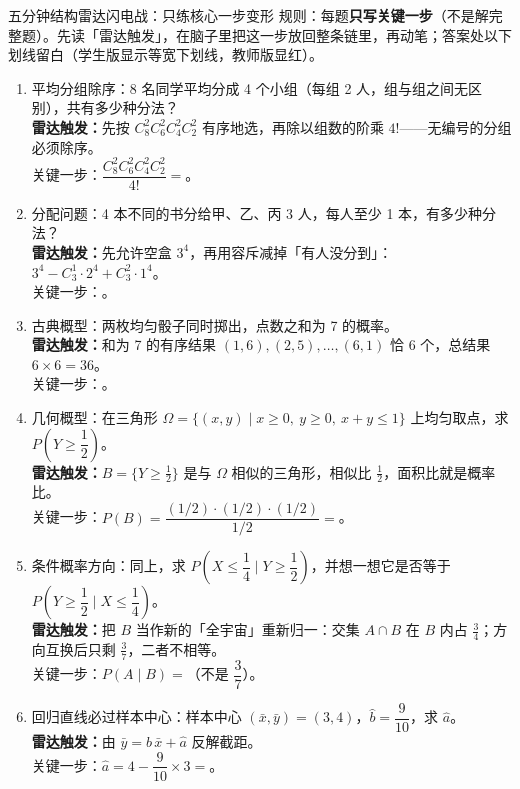 \begin{warmupbox}{五分钟结构雷达闪电战：只练核心一步变形}
规则：每题\textbf{只写关键一步}（不是解完整题）。先读「雷达触发」，在脑子里把这一步放回整条链里，再动笔；答案处以下划线留白（学生版显示等宽下划线，教师版显红）。

\begin{enumerate}[label=(\arabic*), itemsep=5pt]
\item 平均分组除序：8 名同学平均分成 4 个小组（每组 2 人，组与组之间无区别），共有多少种分法？\\
{\small\bfseries\textcolor{third}{雷达触发：}}先按 $C_8^2C_6^2C_4^2C_2^2$ 有序地选，再除以组数的阶乘 $4!$——无编号的分组必须除序。\\
关键一步：$\dfrac{C_8^2C_6^2C_4^2C_2^2}{4!}=$。

\item 分配问题：4 本不同的书分给甲、乙、丙 3 人，每人至少 1 本，有多少种分法？\\
{\small\bfseries\textcolor{third}{雷达触发：}}先允许空盒 $3^4$，再用容斥减掉「有人没分到」：$3^4-C_3^1\cdot2^4+C_3^2\cdot1^4$。\\
关键一步：。

\item 古典概型：两枚均匀骰子同时掷出，点数之和为 7 的概率。\\
{\small\bfseries\textcolor{third}{雷达触发：}}和为 7 的有序结果 $(1,6),(2,5),\dots,(6,1)$ 恰 6 个，总结果 $6\times6=36$。\\
关键一步：。

\item 几何概型：在三角形 $\Omega=\{(x,y)\mid x\ge0,\ y\ge0,\ x+y\le1\}$ 上均匀取点，求 $P\!\left(Y\ge\dfrac12\right)$。\\
{\small\bfseries\textcolor{third}{雷达触发：}}$B=\{Y\ge\tfrac12\}$ 是与 $\Omega$ 相似的三角形，相似比 $\tfrac12$，面积比就是概率比。\\
关键一步：$P(B)=\dfrac{(1/2)\cdot(1/2)\cdot(1/2)}{1/2}=$。

\item 条件概率方向：同上，求 $P\!\left(X\le\dfrac14\mid Y\ge\dfrac12\right)$，并想一想它是否等于 $P\!\left(Y\ge\dfrac12\mid X\le\dfrac14\right)$。\\
{\small\bfseries\textcolor{third}{雷达触发：}}把 $B$ 当作新的「全宇宙」重新归一：交集 $A\cap B$ 在 $B$ 内占 $\tfrac34$；方向互换后只剩 $\tfrac37$，二者不相等。\\
关键一步：$P(A\mid B)=$（不是 $\dfrac37$）。

\item 回归直线必过样本中心：样本中心 $(\bar x,\bar y)=(3,4)$，$\hat b=\dfrac9{10}$，求 $\hat a$。\\
{\small\bfseries\textcolor{third}{雷达触发：}}由 $\bar y=\hat b\,\bar x+\hat a$ 反解截距。\\
关键一步：$\hat a=4-\dfrac9{10}\times3=$。
\end{enumerate}
\end{warmupbox}

